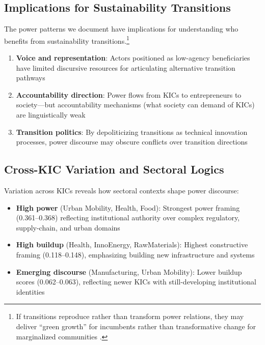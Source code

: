 \documentclass[../main.tex]{subfiles}
\begin{document}
\subsection{Implications for Sustainability Transitions}

The power patterns we document have implications for understanding who benefits from sustainability transitions.\footnote{If transitions reproduce rather than transform power relations, they may deliver ``green growth'' for incumbents rather than transformative change for marginalized communities \cite{tyfield2012transition}.}

\begin{enumerate}
    \item \textbf{Voice and representation}: Actors positioned as low-agency beneficiaries have limited discursive resources for articulating alternative transition pathways

    \item \textbf{Accountability direction}: Power flows from KICs to entrepreneurs to society---but accountability mechanisms (what society can demand of KICs) are linguistically weak

    \item \textbf{Transition politics}: By depoliticizing transitions as technical innovation processes, power discourse may obscure conflicts over transition directions
\end{enumerate}

\subsection{Cross-KIC Variation and Sectoral Logics}

Variation across KICs reveals how sectoral contexts shape power discourse:
\begin{itemize}
    \item \textbf{High power} (Urban Mobility, Health, Food): Strongest power framing (0.361--0.368) reflecting institutional authority over complex regulatory, supply-chain, and urban domains

    \item \textbf{High buildup} (Health, InnoEnergy, RawMaterials): Highest constructive framing (0.118--0.148), emphasizing building new infrastructure and systems

    \item \textbf{Emerging discourse} (Manufacturing, Urban Mobility): Lower buildup scores (0.062--0.063), reflecting newer KICs with still-developing institutional identities
\end{itemize}
\end{document}
